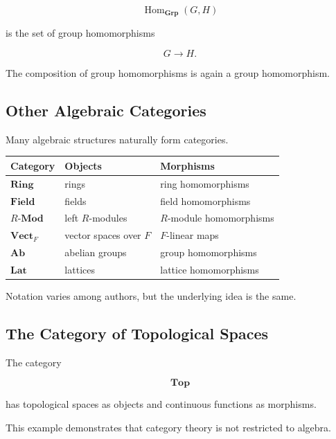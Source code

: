 \[ \operatorname{Hom}_{\mathbf{Grp}}(G,H) \]

is the set of group homomorphisms

\[ G\to H. \]

The composition of group homomorphisms is again a group homomorphism.

\subsection{Other Algebraic Categories}
\label{subsec:algebraic-categories}

Many algebraic structures naturally form categories.

\begin{center}
\begin{tabularx}{0.92\textwidth}{@{}lXX@{}}
\toprule
\textbf{Category} & \textbf{Objects} & \textbf{Morphisms}\\
\midrule
\(\mathbf{Ring}\) & rings & ring homomorphisms\\
\(\mathbf{Field}\) & fields & field homomorphisms\\
\(R\text{-}\mathbf{Mod}\) & left \(R\)-modules & \(R\)-module homomorphisms\\
\(\mathbf{Vect}_F\) & vector spaces over \(F\) & \(F\)-linear maps\\
\(\mathbf{Ab}\) & abelian groups & group homomorphisms\\
\(\mathbf{Lat}\) & lattices & lattice homomorphisms\\
\bottomrule
\end{tabularx}
\end{center}

Notation varies among authors, but the underlying idea is the same.

\subsection{The Category of Topological Spaces}
\label{subsec:category-top}

The category

\[ \mathbf{Top} \]

has topological spaces as objects and continuous functions as morphisms.

This example demonstrates that category theory is not restricted to algebra.

